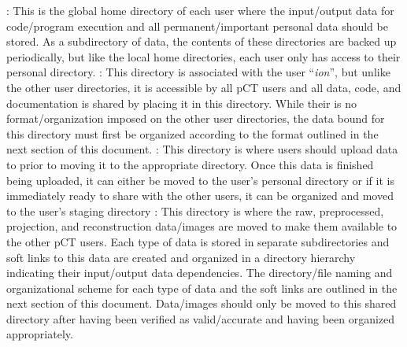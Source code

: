 \documentclass[landscape,12pt]{article}
\begin{document}
\vspace{-5mm}
\flushleft\textbf{}\color{Black} : This is the global home directory of each user where the input/output data for code/program execution and all permanent/important personal data should be stored.  As a subdirectory of data, the contents of these directories are backed up periodically, but like the local home directories, each user only has access to their personal directory.
\vspace{-5mm}
\flushleft\textbf{}\color{Black} : This directory is associated with the user ``\textit{ion}'', but unlike the other user directories, it is accessible by all pCT users and all data, code, and documentation is shared by placing it in this directory.  While their is no format/organization imposed on the other user directories, the data bound for this directory must first be organized according to the format outlined in the next section of this document.
\vspace{-5mm}
\flushleft\textbf{}\color{Black} : This directory is where users should upload data to prior to moving it to the appropriate directory.  Once this data is finished being uploaded, it can either be moved to the user's personal directory \textbf{}\color{Black} or if it is immediately ready to share with the other users, it can be organized and moved to the user's staging directory \textbf{}\color{Black}
\vspace{-5mm}
\flushleft\textbf{}\color{Black} : This directory is where the raw, preprocessed, projection, and reconstruction data/images are moved to make them available to the other pCT users.  Each type of data is stored in separate subdirectories and soft links to this data are created and organized in a directory hierarchy indicating their input/output data dependencies.  The directory/file naming and organizational scheme for each type of data and the soft links are outlined in the next section of this document.  Data/images should only be moved to this shared directory after having been verified as valid/accurate and having been organized appropriately.
\end{document}
